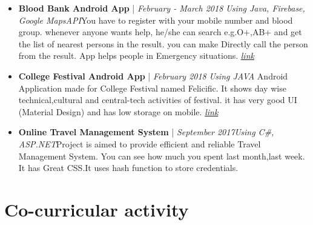 \documentclass[11pt,a4paper,sans]{moderncv}        %
\begin{document}
\begin{itemize}

\item \textbf{Blood Bank Android App} | \textit{February - March 2018} \vspace{3pt}\newline\textit{Using Java, Firebase, Google MapsAPI}\vspace{4pt}\newline \small{You have to register with your mobile number and blood group. whenever anyone wants help, he/she can search e.g.O+,AB+ and get the list of nearest persons in the result. you can make Directly call the person from the result. App helps people in Emergency situations.} \href{https://github.com/denishrana09/BloodBankApp}{\textit{link}}\vspace{6pt}

\newpage

\item{\textbf{College Festival Android App} | \textit{February 2018} \vspace{3pt}\newline\textit{Using JAVA}
\vspace{4pt}\newline
\small{Android Application made for College Festival named Felicific. It shows day wise technical,cultural and central-tech activities of festival. it has very good UI (Material Design) and has low storage on mobile.}}
\href{https://play.google.com/store/apps/details?id=in.opensol.felicific}{\textit{link}}\vspace{6pt}



\item \textbf{Online Travel Management System} | \textit{September 2017}\vspace{3pt}\newline\textit{Using C\#, ASP.NET}\vspace{4pt}\newline \small{Project is aimed to provide efficient and reliable Travel Management System. You can see how much you spent last month,last week. It has Great CSS.It uses hash function to store credentials.} 
\end{itemize}






\section{Co-curricular activity}
\end{document}
